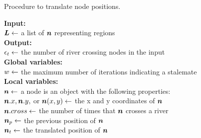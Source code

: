 \begin{algorithm}[H]
    \caption{Procedure to translate node positions.}\label{alg:TranslateNode}

    \textbf{Input:} \\
    $ \bm{L} \gets $ a list of $ \bm{n} $ representing regions \\

    \textbf{Output:} \\
    $ \epsilon_{t} \gets $ the number of river crossing nodes in the input \\

    \textbf{Global variables:} \\
    $ w \gets $ the maximum number of iterations indicating a stalemate \\

    \textbf{Local variables:} \\
    $ \bm{n} \gets $ a node is an object with the following properties: \\
    \-\hspace{1em} $ \bm{n}.x, \bm{n}.y, $ or $ \bm{n}(x,y) \gets $ the x and y coordinates of $ \bm{n} $ \\
    \-\hspace{1em} $ \bm{n}.cross \gets $ the number of times that $ \bm{n} $ crosses a river  \\
    \-\hspace{1em} $ \bm{n}_{p} \gets $ the previous position of $ \bm{n} $ \\
    \-\hspace{1em} $ \bm{n}_t \gets $ the translated position of $ \bm{n} $ \\

\end{algorithm}

